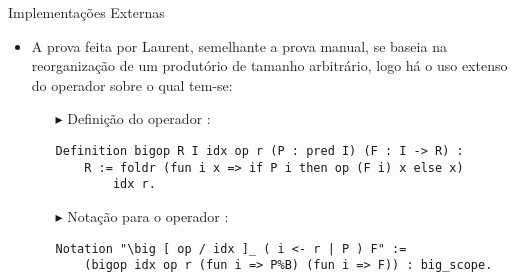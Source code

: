 \begin{frame}[fragile]{Implementações Externas}
    \begin{itemize}
        \item A prova feita por Laurent, semelhante a prova manual, se baseia na reorganização de um produtório de tamanho arbitrário, logo há o uso extenso do operador  sobre o qual tem-se:
        \begin{itemize}
            \item[$\blacktriangleright$] Definição do operador :
                \begin{lstlisting}[language=coq,frame=single,tabsize=1]
Definition bigop R I idx op r (P : pred I) (F : I -> R) : 
    R := foldr (fun i x => if P i then op (F i) x else x) 
        idx r.
                \end{lstlisting}
                                
            \item[$\blacktriangleright$] Notação para o operador :
                \begin{lstlisting}[language=coq,frame=single,tabsize=1]
 Notation "\big [ op / idx ]_ ( i <- r | P ) F" :=
    (bigop idx op r (fun i => P%B) (fun i => F)) : big_scope.
                \end{lstlisting}
        \end{itemize}
    \end{itemize}
\end{frame}

